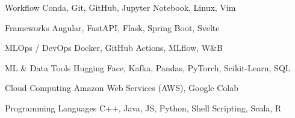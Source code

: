 

\begin{cvskills}

\cvskill
  {Workflow}
  {Conda, Git, GitHub, Jupyter Notebook, Linux, Vim}

\cvskill
  {Frameworks}
  {Angular, FastAPI, Flask, Spring Boot, Svelte}

\cvskill
  {MLOps / DevOps} {Docker, GitHub Actions, MLflow, W\&B}

\cvskill
  {ML \& Data Tools}
  {Hugging Face, Kafka, Pandas, PyTorch, Scikit-Learn, SQL}

\cvskill
  {Cloud Computing}
  {Amazon Web Services (AWS), Google Colab}

\cvskill
  {Programming Languages}
  {C++, Java, JS, Python, Shell Scripting, Scala, R}




\end{cvskills}
